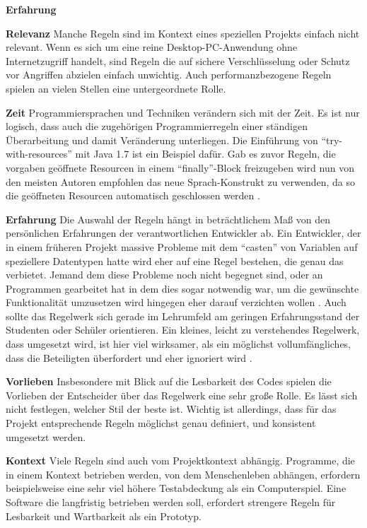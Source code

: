 \documentclass[da,ngerman]{stthesis}
\begin{document}
			\begin{labeling}{\textbf{Erfahrung}}
				\item [\textbf{Relevanz}] Manche Regeln sind im Kontext eines speziellen Projekts einfach nicht relevant. Wenn es sich um eine reine Desktop-PC-Anwendung ohne Internetzugriff handelt, sind Regeln die auf sichere Verschlüsselung oder Schutz vor Angriffen abzielen einfach unwichtig. Auch performanzbezogene Regeln spielen an vielen Stellen eine untergeordnete Rolle. 
				\item [\textbf{Zeit}] Programmiersprachen und Techniken verändern sich mit der Zeit. Es ist nur logisch, dass auch die zugehörigen Programmierregeln einer ständigen Überarbeitung und damit Veränderung unterliegen. Die Einführung von "`try-with-resources"' mit Java 1.7 ist ein Beispiel dafür. Gab es zuvor Regeln, die vorgaben geöffnete Resourcen in einem "`finally"'-Block freizugeben \cite{ElementsOfJavaStyle} wird nun von den meisten Autoren empfohlen das neue Sprach-Konstrukt zu verwenden, da so die geöffneten Resourcen automatisch geschlossen werden \cite{JavaCodingGuidelines}.
				\item [\textbf{Erfahrung}] Die Auswahl der Regeln hängt in beträchtlichem Maß von den persönlichen Erfahrungen der verantwortlichen Entwickler ab. Ein Entwickler, der in einem früheren Projekt massive Probleme mit dem "`casten"' von Variablen auf speziellere Datentypen hatte wird eher auf eine Regel bestehen, die genau das verbietet. Jemand dem diese Probleme noch nicht begegnet sind, oder an Programmen gearbeitet hat in dem dies sogar notwendig war, um die gewünschte Funktionalität umzusetzen wird hingegen eher darauf verzichten wollen \cite{JavaQualityAssurance}. Auch sollte das Regelwerk sich gerade im Lehrumfeld am geringen Erfahrungsstand der Studenten oder Schüler orientieren. Ein kleines, leicht zu verstehendes Regelwerk, dass umgesetzt wird, ist hier viel wirksamer, als ein möglichst vollumfängliches, dass die Beteiligten überfordert und eher ignoriert wird \cite{CleanCodeImPraktikum}.
				  \item [\textbf{Vorlieben}] Insbesondere mit Blick auf die Lesbarkeit des Codes spielen die Vorlieben der Entscheider über das Regelwerk eine sehr große Rolle. Es lässt sich nicht festlegen, welcher Stil der beste ist. Wichtig ist allerdings, dass für das Projekt entsprechende Regeln möglichst genau definiert, und konsistent umgesetzt werden. 
				  \item [\textbf{Kontext}] Viele Regeln sind auch vom Projektkontext abhängig. Programme, die in einem Kontext betrieben werden, von dem Menschenleben abhängen, erfordern beispielsweise eine sehr viel höhere Testabdeckung als ein Computerspiel. Eine Software die langfristig betrieben werden soll, erfordert strengere Regeln für Lesbarkeit und Wartbarkeit als ein Prototyp.  

\end{labeling}
\end{document}

